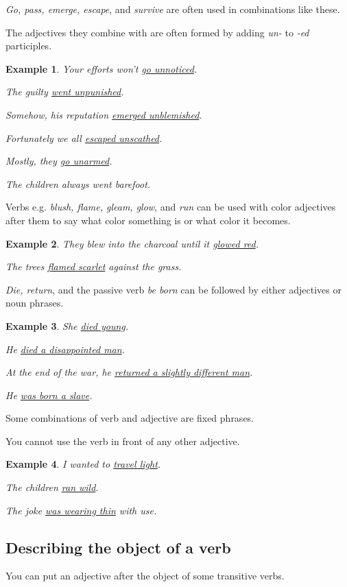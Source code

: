 \documentclass[oneside]{book}
\numberwithin{equation}{section}
\newtheorem{example}{Example}[section]
\begin{document}
%
\textit{Go, pass, emerge, escape}, and \textit{survive} are often used in combinations like these.

The adjectives they combine with are often formed by adding \textit{un-} to \textit{-ed} participles.
\begin{example}
    Your efforts won't \underline{go unnoticed}.
    
    The guilty \underline{went unpunished}.
    
    Somehow, his reputation \underline{emerged unblemished}.
    
    Fortunately we all \underline{escaped unscathed}.
    
    Mostly, they \underline{go unarmed}.
    
    The children always went barefoot.
\end{example}
%
\noindent{} Verbs e.g. \textit{blush, flame, gleam, glow}, and \textit{run} can be used with color adjectives after them to say what color something is or what color it becomes.
\begin{example}
    They blew into the charcoal until it \underline{glowed red}.
    
    The trees \underline{flamed scarlet} against the grass.
\end{example}
%
\noindent{} \textit{Die, return}, and the passive verb \textit{be born} can be followed by either adjectives or noun phrases.
\begin{example}
    She \underline{died young}.
    
    He \underline{died a disappointed man}.
    
    At the end of the war, he \underline{returned a slightly different man}.
    
    He \underline{was born a slave}.
\end{example}
%
\noindent{} Some combinations of verb and adjective are fixed phrases.

You cannot use the verb in front of any other adjective.
\begin{example}
    I wanted to \underline{travel light}.
    
    The children \underline{ran wild}.
    
    The joke \underline{was wearing thin} with use.
\end{example}

\subsection{Describing the object of a verb}
\noindent{} You can put an adjective after the object of some transitive verbs.
\end{document}

